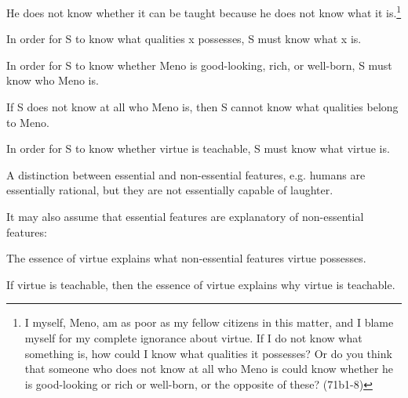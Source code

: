 \documentclass{tufte-handout}
\begin{document}
 He does not know whether it can be taught because he does not know what it is.\footnote{\small{I myself, Meno, am as poor as my fellow citizens in this matter, and I blame myself for my complete ignorance about virtue. If I do not know what something is, how could I know what qualities it possesses? Or do you think that someone who does not know at all who Meno is could know whether he is good-looking or rich or well-born, or the opposite of these? (71b1-8)}}
\begin{enumerate*}
\item In order for S to know what qualities x possesses, S must know what x is. 
\item In order for S to know whether Meno is good-looking, rich, or well-born, S must know who Meno is.
\begin{enumerate*}
\item If S does not know at all who Meno is, then S cannot know what qualities belong to Meno. 
\end{enumerate*} 
\item In order for S to know whether virtue is teachable, S must know what virtue is.  
\end{enumerate*}
\begin{fullwidth}
\begin{enumerate*}
\item A distinction between essential and non-essential features, e.g. humans are essentially rational, but they are not essentially capable of laughter.
\item It may also assume that essential features are explanatory of non-essential features: 
\begin{enumerate*}
\item The essence of virtue explains what non-essential features virtue possesses. 
\item If virtue is teachable, then the essence of virtue explains why virtue is teachable. 
\end{enumerate*} 
\end{enumerate*}
\end{fullwidth}
\end{document}
